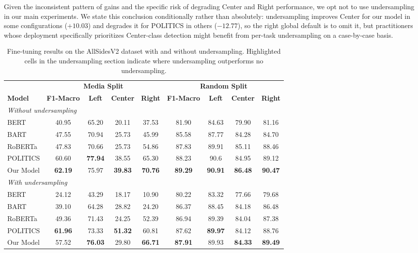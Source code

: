 Given the inconsistent pattern of gains and the specific risk of degrading Center and Right performance, we opt not to use undersampling in our main experiments. We state this conclusion conditionally rather than absolutely: undersampling improves Center for our model in some configurations ($+10.03$) and degrades it for POLITICS in others ($-12.77$), so the right global default is to omit it, but practitioners whose deployment specifically prioritizes Center-class detection might benefit from per-task undersampling on a case-by-case basis.

\begin{table}[ht]
\centering
\small
\begin{tabular}{lcccccccc}
\toprule
& \multicolumn{4}{c}{\textbf{Media Split}} & \multicolumn{4}{c}{\textbf{Random Split}} \\
\cmidrule(lr){2-5} \cmidrule(lr){6-9}
\textbf{Model} & \textbf{F1-Macro} & \textbf{Left} & \textbf{Center} & \textbf{Right}
               & \textbf{F1-Macro} & \textbf{Left} & \textbf{Center} & \textbf{Right} \\
\midrule
\multicolumn{9}{l}{\textit{Without undersampling}} \\
\midrule
BERT      & 40.95 & 65.20 & 20.11 & 37.53 & 81.90 & 84.63 & 79.90 & 81.16 \\
BART      & 47.55 & 70.94 & 25.73 & 45.99 & 85.58 & 87.77 & 84.28 & 84.70 \\
RoBERTa   & 47.83 & 70.66 & 25.73 & 54.86 & 87.83 & 89.91 & 85.11 & 88.46 \\
POLITICS  & 60.60 & \textbf{77.94} & 38.55 & 65.30 & 88.23 & 90.6 & 84.95 & 89.12 \\
Our Model & \textbf{62.19} & 75.97 & \textbf{39.83} & \textbf{70.76} & \textbf{89.29} & \textbf{90.91} & \textbf{86.48} & \textbf{90.47} \\
\midrule
\multicolumn{9}{l}{\textit{With undersampling}} \\
\midrule
BERT      & 24.12 & 43.29 & 18.17 &  10.90 & 80.22 & 83.32 & 77.66 & 79.68\\
BART      & 39.10 & 64.28 & \cellcolor{red!15}28.82 & 24.20 & \cellcolor{red!15}86.37 & \cellcolor{red!15}88.45 & 84.18 & \cellcolor{red!15}86.48 \\
RoBERTa   & \cellcolor{red!15}49.36 & \cellcolor{red!15}71.43 & 24.25 & 52.39 & 86.94 & 89.39 & 84.04 & 87.38 \\
POLITICS  & \cellcolor{red!15}\textbf{61.96} & 73.33 & \cellcolor{red!15}\textbf{51.32} & 60.81 & 87.62 & \textbf{89.97} & 84.12 & 88.76 \\
Our Model & 57.52 & \cellcolor{red!15}\textbf{76.03} & 29.80 & \textbf{66.71} & \textbf{87.91} & 89.93 & \textbf{84.33} & \textbf{89.49} \\
\bottomrule
\end{tabular}
\caption{Fine-tuning results on the AllSidesV2 dataset with and without undersampling. \colorbox{red!15}{Highlighted} cells in the undersampling section indicate where undersampling outperforms no undersampling.}
\label{tab:no_undersampling_and_undersampling}
\end{table}


